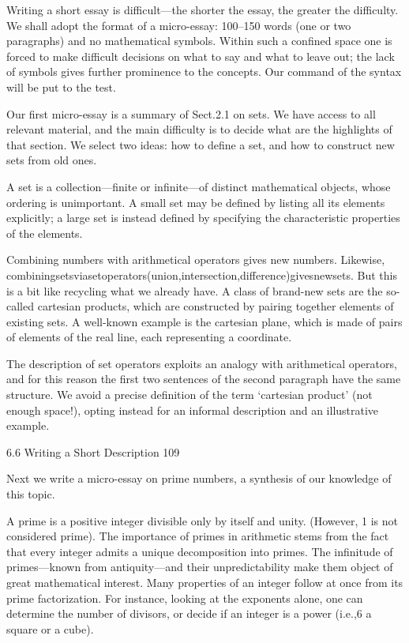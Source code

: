 \documentclass[11pt]{article}
\theoremstyle{plain}
\theoremstyle{definition}
\begin{document}
Writing a short essay is difficult---the shorter the essay, the greater the difficulty. We shall adopt the format of a micro-essay: 100--150 words (one or two paragraphs) and no mathematical symbols. Within such a confined space one is forced to make difficult decisions on what to say and what to leave out; the lack of symbols gives further prominence to the concepts. Our command of the syntax will be put to the test.

Our first micro-essay is a summary of Sect.2.1 on sets. We have access to all relevant material, and the main difficulty is to decide what are the highlights of that section. We select two ideas: how to define a set, and how to construct new sets from old ones.

A set is a collection---finite or infinite---of distinct mathematical objects, whose ordering is unimportant. A small set may be defined by listing all its elements explicitly; a large set is instead defined by specifying the characteristic properties of the elements.

Combining numbers with arithmetical operators gives new numbers. Likewise, combiningsetsviasetoperators(union,intersection,difference)givesnewsets. But this is a bit like recycling what we already have. A class of brand-new sets are the so-called cartesian products, which are constructed by pairing together elements of existing sets. A well-known example is the cartesian plane, which is made of pairs of elements of the real line, each representing a coordinate.

The description of set operators exploits an analogy with arithmetical operators, and for this reason the first two sentences of the second paragraph have the same structure. We avoid a precise definition of the term `cartesian product' (not enough space!), opting instead for an informal description and an illustrative example.

6.6 Writing a Short Description 109

Next we write a micro-essay on prime numbers, a synthesis of our knowledge of this topic.

A prime is a positive integer divisible only by itself and unity. (However, 1 is not considered prime). The importance of primes in arithmetic stems from the fact that every integer admits a unique decomposition into primes. The infinitude of primes---known from antiquity---and their unpredictability make them object of great mathematical interest. Many properties of an integer follow at once from its prime factorization. For instance, looking at the exponents alone, one can determine the number of divisors, or decide if an integer is a power (i.e.,6 a square or a cube).
\end{document}
